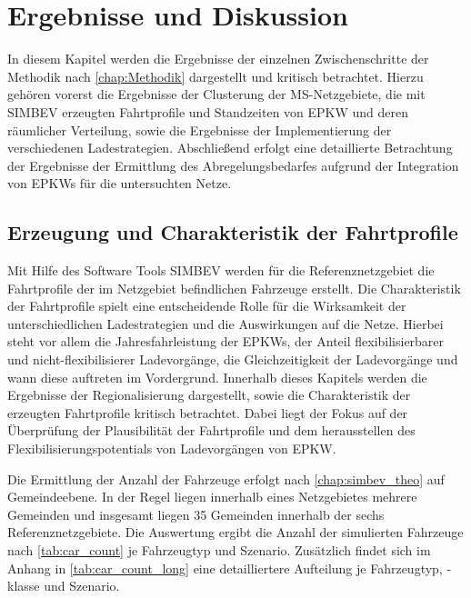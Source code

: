 \section{Ergebnisse und Diskussion}\label{chap:results}

In diesem Kapitel werden die Ergebnisse der einzelnen Zwischenschritte der Methodik nach \autoref{chap:Methodik} dargestellt und kritisch betrachtet.
Hierzu gehören vorerst die Ergebnisse der Clusterung der \gls{MS}-Netzgebiete, die mit \gls{SIMBEV} erzeugten Fahrtprofile und Standzeiten von \gls{EPKW} und deren räumlicher Verteilung, sowie die Ergebnisse der Implementierung der verschiedenen Ladestrategien.
Abschließend erfolgt eine detaillierte Betrachtung der Ergebnisse der Ermittlung des Abregelungsbedarfes aufgrund der Integration von \glspl{EPKW} für die untersuchten Netze.


\subsection{Erzeugung und Charakteristik der Fahrtprofile}

Mit Hilfe des Software Tools \gls{SIMBEV} werden für die Referenznetzgebiet die Fahrtprofile der im Netzgebiet befindlichen Fahrzeuge erstellt.
Die Charakteristik der Fahrtprofile spielt eine entscheidende Rolle für die Wirksamkeit der unterschiedlichen Ladestrategien und die Auswirkungen auf die Netze.
Hierbei steht vor allem die Jahresfahrleistung der \glspl{EPKW}, der Anteil flexibilisierbarer und nicht-flexibilisierer Ladevorgänge, die Gleichzeitigkeit der Ladevorgänge und wann diese auftreten im Vordergrund.
Innerhalb dieses Kapitels werden die Ergebnisse der Regionalisierung dargestellt, sowie die Charakteristik der erzeugten Fahrtprofile kritisch betrachtet.
Dabei liegt der Fokus auf der Überprüfung der Plausibilität der Fahrtprofile und dem herausstellen des Flexibilisierungspotentials von Ladevorgängen von \gls{EPKW}.\medskip

Die Ermittlung der Anzahl der Fahrzeuge erfolgt nach \autoref{chap:simbev_theo} auf Gemeindeebene.
In der Regel liegen innerhalb eines Netzgebietes mehrere Gemeinden und insgesamt liegen \num{35} Gemeinden innerhalb der sechs Referenznetzgebiete.
Die Auswertung ergibt die Anzahl der simulierten Fahrzeuge nach \autoref{tab:car_count} je Fahrzeugtyp und Szenario.
Zusätzlich findet sich im Anhang in \autoref{tab:car_count_long} eine detailliertere Aufteilung je Fahrzeugtyp, -klasse und Szenario.



